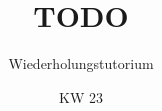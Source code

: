 \relax\relax

\iffull
\title{TODO}
\subtitle{Wiederholungstutorium}
\date{KW 23}

\fi
{}

\iffull
\titleframe

\fi

\begin{frame}

\end{frame}

\iffull\fi
